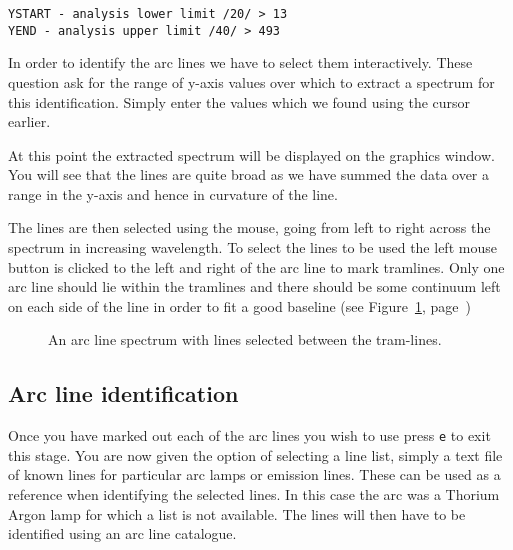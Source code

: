 \documentclass[twoside,11pt]{article}
\newcommand{\scspec}[2]{#1}
\newcommand{\scspec}[2]{#2}
\begin{document}
{\scspec{\small}{}
\begin{verbatim}
YSTART - analysis lower limit /20/ > 13
YEND - analysis upper limit /40/ > 493
\end{verbatim}
}



In order to identify the arc lines we have to select them
interactively. These question ask for the range of y-axis values over
which to extract a spectrum for this identification. Simply enter the
values which we found using the cursor earlier.

At this point the extracted spectrum will be displayed on the graphics
window. You will see that the lines are quite broad as we have summed
the data over a range in the y-axis and hence in curvature of the
line.

The lines are then selected using the mouse, going from left to right
across the spectrum in increasing wavelength. To select the lines to
be used the left mouse button is clicked to the left and right of the
arc line to mark tramlines. Only one arc line should lie within the
tramlines and there should be some continuum left on each side of the
line in order to fit a good baseline (see
\scspec{Figure~\ref{arc_select}, page~\pageref{arc_select}}{the figure
below.})


\begin{figure}
\begin{center}
\scspec{\leavevmode\epsfysize=105mm\epsfbox{sc7_14.eps}}
       {\leavevmode\epsfysize=136mm}

  \parbox{140mm}{
    \caption{An arc line spectrum with lines selected between the
             tram-lines.}
    \label{arc_select}
  }
\end{center}
\end{figure}


\subsection{Arc line identification}

Once you have marked out each of the arc lines you wish to use press
{\tt e} to exit this stage. You are now given the option of selecting
a line list, simply a text file of known lines for particular arc
lamps or emission lines. These can be used as a reference when
identifying the selected lines. In this case the arc was a Thorium
Argon lamp for which a list is not available. The lines will then have
to be identified using an arc line catalogue.
\goodbreak
\end{document}
